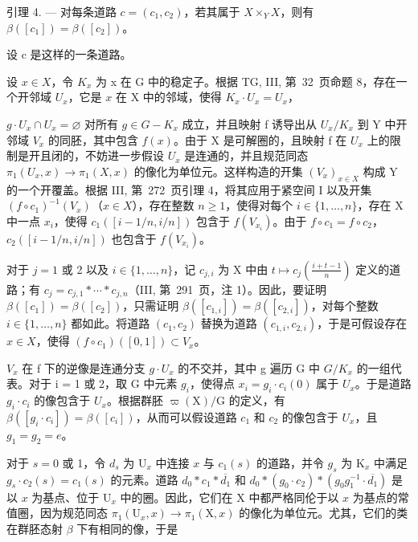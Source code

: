 引理 4. --- 对每条道路 \(c = (c_1, c_2)\)，若其属于 \(X \times_Y X\)，则有 \(\beta([c_1]) = \beta([c_2])\)。

设 c 是这样的一条道路。

设 \(x \in X\)，令 \(K_x\) 为 x 在 G 中的稳定子。根据 TG, III, 第~32~页命题 8，存在一个开邻域 \(U_x\)，它是 \(x\) 在 X 中的邻域，使得 \(K_x \cdot U_x = U_x\)，

\(g \cdot U_x \cap U_x = \varnothing\) 对所有 \(g \in G - K_x\) 成立，并且映射 f 诱导出从 \(U_x/K_x\) 到 Y 中开邻域 \(V_x\) 的同胚，其中包含 \(f(x)\)。由于 X 是可解圈的，且映射 f 在 \(U_x\) 上的限制是开且闭的，不妨进一步假设 \(U_x\) 是连通的，并且规范同态 \(\pi_1(U_x, x) \to \pi_1(X, x)\) 的像化为单位元。这样构造的开集 \((V_x)_{x \in X}\) 构成 Y 的一个开覆盖。根据 III, 第~272~页引理 4，将其应用于紧空间 I 以及开集 \((f \circ c_1)^{-1}(V_x)\)（\(x \in X\)），存在整数 \(n \geqslant 1\)，使得对每个 \(i \in \{1, \ldots, n\}\)，存在 X 中一点 \(x_i\)，使得 \(c_1([i-1/n, i/n])\) 包含于 \(f(V_{x_i})\)。由于 \(f \circ c_1 = f \circ c_2\)，\(c_2([i-1/n, i/n])\) 也包含于 \(f(V_{x_i})\)。

对于 \(j = 1\) 或 2 以及 \(i \in \{1, \ldots, n\}\)，记 \(c_{j,i}\) 为 X 中由 \(t \mapsto c_j(\frac{i+t-1}{n})\) 定义的道路；有 \(c_j = c_{j,1} * \cdots * c_{j,n}\)（III, 第~291~页，注 1）。因此，要证明 \(\beta([c_1]) = \beta([c_2])\)，只需证明 \(\beta([c_{1,i}]) = \beta([c_{2,i}])\)，对每个整数 \(i \in \{1, \ldots, n\}\) 都如此。将道路 \((c_1, c_2)\) 替换为道路 \((c_{1,i}, c_{2,i})\)，于是可假设存在 \(x \in X\)，使得 \((f \circ c_1)([0,1]) \subset V_x\)。

\(V_{x}\) 在 f 下的逆像是连通分支 \(g \cdot U_{x}\) 的不交并，其中 g 遍历 G 中 \(G/K_{x}\) 的一组代表。对于 i = 1 或 2，取 G 中元素 \(g_{i}\)，使得点 \(x_{i} = g_{i} \cdot c_{i}(0)\) 属于 \(U_{x}\)。于是道路 \(g_{i} \cdot c_{i}\) 的像包含于 \(U_{x}\)。根据群胚 \(\varpi(\mathrm{X})/\mathrm{G}\) 的定义，有 \(\beta([g_{i} \cdot c_{i}]) = \beta([c_{i}])\)，从而可以假设道路 \(c_{1}\) 和 \(c_{2}\) 的像包含于 \(U_{x}\)，且 \(g_{1} = g_{2} = e\)。

对于 \(s=0\) 或 1，令 \(d_{s}\) 为 \(\mathrm{U}_{x}\) 中连接 \(x\) 与 \(c_{1}(s)\) 的道路，并令 \(g_{s}\) 为 \(\mathrm{K}_{x}\) 中满足 \(g_{s}\cdot c_{2}(s)=c_{1}(s)\) 的元素。道路 \(d_{0}*c_{1}*\overline{d_{1}}\) 和 \(d_{0}*(g_{0}\cdot c_{2})*(g_{0}g_{1}^{-1}\cdot\overline{d_{1}})\) 是以 \(x\) 为基点、位于 \(\mathrm{U}_{x}\) 中的圈。因此，它们在 X 中都严格同伦于以 \(x\) 为基点的常值圈，因为规范同态 \(\pi_{1}(\mathrm{U}_{x},x)\to\pi_{1}(\mathrm{X},x)\) 的像化为单位元。尤其，它们的类在群胚态射 \(\beta\) 下有相同的像，于是

